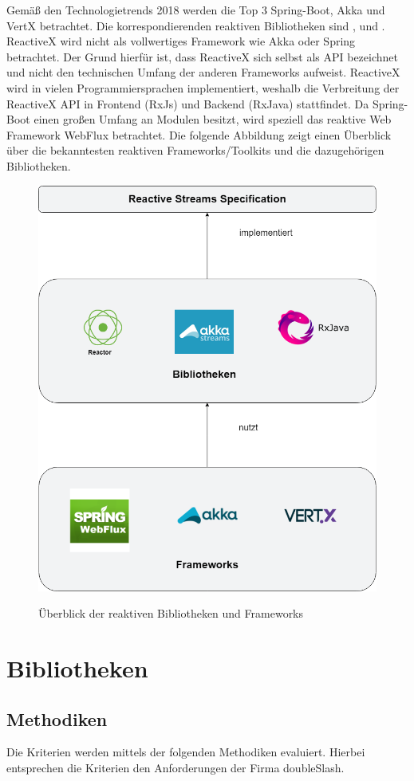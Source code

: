 Gemäß den Technologietrends 2018 werden die Top 3 Spring-Boot, Akka und VertX betrachtet. Die korrespondierenden reaktiven Bibliotheken sind \hyperref[eval:rxjava]{\textbf{}}, \hyperref[eval:reactor]{\textbf{}} und \hyperref[eval:akka-streams]{\textbf{}}. ReactiveX wird nicht als vollwertiges Framework wie Akka oder Spring betrachtet. Der Grund hierfür ist, dass ReactiveX sich selbst als API bezeichnet und nicht den technischen Umfang der anderen Frameworks aufweist. ReactiveX wird in vielen Programmiersprachen implementiert, weshalb die Verbreitung der ReactiveX API in Frontend (RxJs) und Backend (RxJava) stattfindet. Da Spring-Boot einen großen Umfang an Modulen besitzt, wird speziell das reaktive Web Framework WebFlux betrachtet.
\clearpage
Die folgende Abbildung zeigt einen Überblick über die bekanntesten reaktiven Frameworks/Toolkits und die dazugehörigen Bibliotheken.  

\begin{center}
\begin{figure}[H]
	\centering
    \caption{Überblick der reaktiven Bibliotheken und Frameworks}
    \includegraphics[width=.50\linewidth]{media/reactive_landscape}
    \label{benchmark}
\end{figure}
\end{center}

\section{Bibliotheken}
\subsection{Methodiken}
\newcommand{\colorize}[1]{§\colorbox{yellow}{{#1}}§}
\newcommand{\criteriaLizenz}{Lizenz und Kosten}
\newcommand{\criteriaSupport}{Support von Technologien}
\newcommand{\criteriaDoku}{Dokumentation}
\newcommand{\criteriaHandhabung}{Handhabung der Bibliothek}
\newcommand{\criteriaWeiterentwicklung}{Weiterentwicklung}
\newcommand{\criteriaVerbreitung}{Verbreitung}
Die Kriterien werden mittels der folgenden Methodiken evaluiert. Hierbei entsprechen die Kriterien den Anforderungen der Firma doubleSlash.

